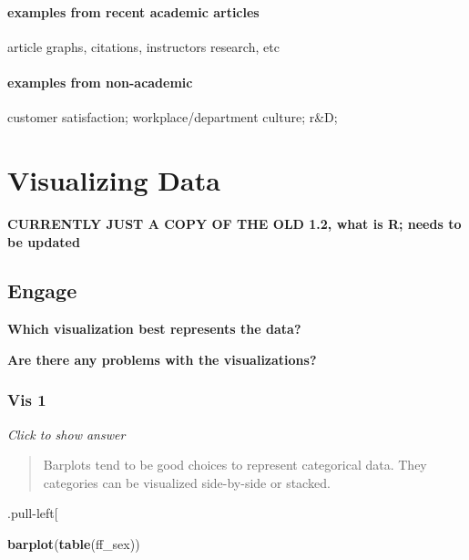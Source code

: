 \documentclass[
]{book}
\newenvironment{Shaded}{\begin{snugshade}}{\end{snugshade}}
\newcommand{\FunctionTok}[1]{\textcolor[rgb]{0.13,0.29,0.53}{\textbf{#1}}}
\newcommand{\NormalTok}[1]{#1}
\begin{document}
\hypertarget{examples-from-recent-academic-articles}{%
\subsubsection{examples from recent academic articles}\label{examples-from-recent-academic-articles}}

article graphs, citations, instructors research, etc

\hypertarget{examples-from-non-academic}{%
\subsubsection{examples from non-academic}\label{examples-from-non-academic}}

customer satisfaction; workplace/department culture; r\&D;

\hypertarget{visualizing-data}{%
\chapter{Visualizing Data}\label{visualizing-data}}

\textbf{CURRENTLY JUST A COPY OF THE OLD 1.2, what is R; needs to be updated }

\hypertarget{engage-1}{%
\section{Engage}\label{engage-1}}

\textbf{Which visualization best represents the data?}

\textbf{Are there any problems with the visualizations?}

\hypertarget{vis-1}{%
\subsection{Vis 1}\label{vis-1}}

\emph{Click to show answer}

\begin{quote}
Barplots tend to be good choices to represent categorical data. They categories can be visualized side-by-side or stacked.
\end{quote}

.pull-left{[}

\begin{Shaded}
\begin{Highlighting}[]
\FunctionTok{barplot}\NormalTok{(}\FunctionTok{table}\NormalTok{(ff\_sex))}
\end{Highlighting}
\end{Shaded}
\end{document}
